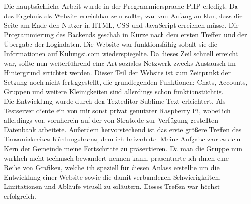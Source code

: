 Die hauptsächliche Arbeit wurde in der Programmiersprache PHP erledigt.
Da das Ergebnis als Website erreichbar sein sollte,
war von Anfang an klar, dass die Seite am Ende den Nutzer in HTML, CSS und JavaScript
erreichen müsse.
Die Programmierung des Backends geschah in Kürze nach dem ersten Treffen und der Übergabe der Logindaten.
Die Website war funktionsfähig sobalt sie die Informationen auf Kulungsi.com wiederspiegelte.
Da dieses Zeil schnell erreicht war, sollte nun weiterführend eine Art soziales Netzwerk zwecks Austausch im Hintergrund errichtet werden.
Dieser Teil der Website ist zum Zeitpunkt der Setzung noch nicht fertiggestellt, die grundlegenden
Funktionen: Chats, Accounts, Gruppen und weitere Kleinigkeiten sind allerdings schon funktionstüchtig.\\
Die Entwicklung wurde durch den Texteditor Sublime Text erleichtert. Als Testserver diente ein von mir sonst privat genutzter Raspberry Pi,
wobei ich allerdings von vornherein auf der von Strato.de zur Verfügung gestellten Datenbank arbeitete.
Außerdem hervorstechend ist das erste größere Treffen des Tansaniakreises Kühlungsborns, dem ich beiwohnte.
Meine Aufgabe war es dem Kern der Gemeinde meine Fortschritte zu präsentieren.
Da man die Gruppe nun wirklich nicht technisch-bewandert nennen kann,
präsentierte ich ihnen eine Reihe von Grafiken,
welche ich speziell für diesen Anlass erstellte um die Entwicklung einer Website sowie die damit verbundenen Schwierigkeiten, Limitationen und Abläufe visuell zu erläutern.
Dieses Treffen war höchst erfolgreich.


